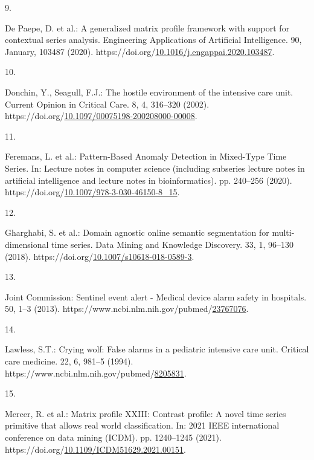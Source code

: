 \documentclass[runningheads]{llncs}
\newlength{\cslhangindent}
\newlength{\csllabelwidth}
\newenvironment{CSLReferences}[2] %
 {%
  \setlength{\parindent}{0pt}
  \ifodd #1 \everypar{\setlength{\hangindent}{\cslhangindent}}\ignorespaces\fi
  \ifnum #2 > 0
  \setlength{\parskip}{#2\baselineskip}
  \fi
 }%
 {}
\newcommand{\CSLLeftMargin}[1]{\parbox[t]{\csllabelwidth}{#1}}
\newcommand{\CSLRightInline}[1]{\parbox[t]{\linewidth - \csllabelwidth}{#1}\break}
\begin{document}
\begin{CSLReferences}{0}{0}
\leavevmode{}%
\CSLLeftMargin{9. }
\CSLRightInline{De Paepe, D. et al.: {A generalized matrix profile framework with support for contextual series analysis}. Engineering Applications of Artificial Intelligence. 90, January, 103487 (2020). https://doi.org/\href{https://doi.org/10.1016/j.engappai.2020.103487}{10.1016/j.engappai.2020.103487}.}

\leavevmode{}%
\CSLLeftMargin{10. }
\CSLRightInline{Donchin, Y., Seagull, F.J.: The hostile environment of the intensive care unit. Current Opinion in Critical Care. 8, 4, 316--320 (2002). https://doi.org/\href{https://doi.org/10.1097/00075198-200208000-00008}{10.1097/00075198-200208000-00008}.}

\leavevmode{}%
\CSLLeftMargin{11. }
\CSLRightInline{Feremans, L. et al.: {Pattern-Based Anomaly Detection in Mixed-Type Time Series}. In: Lecture notes in computer science (including subseries lecture notes in artificial intelligence and lecture notes in bioinformatics). pp. 240--256 (2020). https://doi.org/\href{https://doi.org/10.1007/978-3-030-46150-8_15}{10.1007/978-3-030-46150-8\_15}.}

\leavevmode{}%
\CSLLeftMargin{12. }
\CSLRightInline{Gharghabi, S. et al.: Domain agnostic online semantic segmentation for multi-dimensional time series. Data Mining and Knowledge Discovery. 33, 1, 96--130 (2018). https://doi.org/\href{https://doi.org/10.1007/s10618-018-0589-3}{10.1007/s10618-018-0589-3}.}

\leavevmode{}%
\CSLLeftMargin{13. }
\CSLRightInline{Joint Commission: {Sentinel event alert - Medical device alarm safety in hospitals.} 50, 1--3 (2013). https://www.ncbi.nlm.nih.gov/pubmed/\href{https://www.ncbi.nlm.nih.gov/pubmed/23767076}{23767076}.}

\leavevmode{}%
\CSLLeftMargin{14. }
\CSLRightInline{Lawless, S.T.: Crying wolf: False alarms in a pediatric intensive care unit. Critical care medicine. 22, 6, 981--5 (1994). https://www.ncbi.nlm.nih.gov/pubmed/\href{https://www.ncbi.nlm.nih.gov/pubmed/8205831}{8205831}.}

\leavevmode{}%
\CSLLeftMargin{15. }
\CSLRightInline{Mercer, R. et al.: Matrix profile XXIII: Contrast profile: A novel time series primitive that allows real world classification. In: 2021 IEEE international conference on data mining (ICDM). pp. 1240--1245 (2021). https://doi.org/\href{https://doi.org/10.1109/ICDM51629.2021.00151}{10.1109/ICDM51629.2021.00151}.}


\end{CSLReferences}
\end{document}

